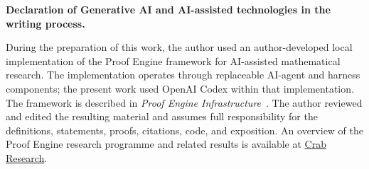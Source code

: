 \documentclass[11pt]{article}
\theoremstyle{definition}
\theoremstyle{remark}
\begin{document}
\medskip
\noindent\textbf{Declaration of Generative AI and AI-assisted technologies in
the writing process.}\par
During the preparation of this work, the author used an author-developed local
implementation of the Proof Engine framework for AI-assisted mathematical
research.  The implementation operates through replaceable AI-agent and
harness components; the present work used OpenAI Codex within that
implementation.  The framework is described in \emph{Proof Engine
Infrastructure}~\cite{LiProofEngine2026}.  The author reviewed and edited the
resulting material and assumes full responsibility for the definitions,
statements, proofs, citations, code, and exposition.
An overview of the Proof Engine research programme and related results is
available at \href{https://crabresearch.com/research/mathematics?lang=en}{Crab Research}.
\endgroup

\begingroup
\small


\endgroup
\medskip{}
\end{document}
